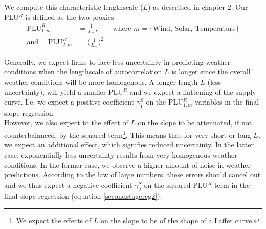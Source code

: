 We compute this characteristic lengthscale ($L$) as described in chapter 2. Our PLU$^R$ is defined as the two proxies 
\begin{align}
 \text{PLU}^R_{1,m} &= \frac{1}{L_m}, \quad \quad  \text{where } m=\{\text{Wind, Solar, Temperature}\} \\
  \text{and }  \quad \text{PLU}^R_{2,m} &=  \bigl(\frac{1}{L_m}\bigr)^2
\end{align}

Generally, we expect firms to face less uncertainty in predicting weather conditions when the lengthscale of autocorrelation $L$ is longer since the overall weather conditions will be more homogenous. A longer length $L$ (less uncertainty), will yield a smaller PLU$^R$ and we expect a flattening of the supply curve. I.e. we expect a positive coefficient $\gamma^S_1$ on the PLU$^R_{1,m}$ variables in the final slope regression.\\

However, we also expect to the effect of $L$ on the slope to be attenuated, if not counterbalanced, by the squared term\footnote{We expect the effects of $L$ on the slope to be of the shape of a Laffer curve.}. This means that for very short or long $L$, we expect an additional effect, which signifies reduced uncertainty. In the latter case, exponentially less uncertainty results from very homogenous weather conditions. In the former case, we observe a higher amount of noise in weather predictions. According to the law of large numbers, these errors should cancel out and we thus expect a negative coefficient $\gamma^S_2$ on the squared PLU$^R$ term in the final slope regression (equation \ref{secondstagereg2}). 




